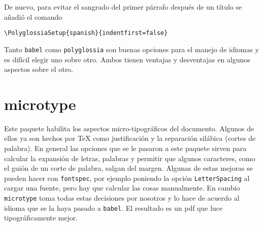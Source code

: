 De nuevo, para evitar el sangrado del primer párrafo después de un título
se añadió el comando
\begin{flushleft}
  \verb|\PolyglossiaSetup{spanish}{indentfirst=false}|
\end{flushleft}

Tanto \texttt{babel} como \texttt{polyglossia} son buenas opciones para el
manejo de idiomas y es difícil elegir uno sobre otro. Ambos tienen ventajas
y desventajas en algunos aspectos sobre el otro.


\section{microtype}
Este paquete habilita los aspectos micro-tipográficos del documento. Algunos
de ellos ya son hechos por \TeX{} como justificación y la separación
silábica (cortes de palabra). En general las opciones que se le pasaron a
este paquete sirven para calcular la expansión de letras, palabras y
permitir que algunos caracteres, como el guión de un corte de palabra,
salgan del margen. Algunas de estas mejoras se pueden hacer con
\texttt{fontspec}, por ejemplo poniendo la opción \texttt{LetterSpacing} al
cargar una fuente, pero hay que calcular las cosas manualmente. En cambio
\texttt{microtype} toma todas estas decisiones por nosotros y lo hace
de acuerdo al idioma que se la haya pasado a \texttt{babel}. El resultado es
un pdf que luce tipográficamente mejor.



